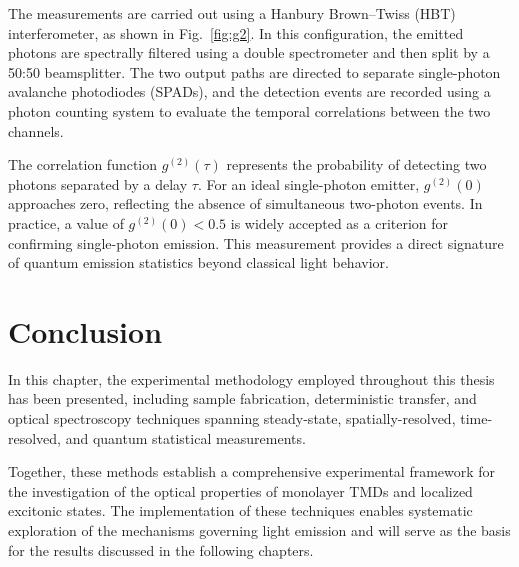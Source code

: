 The measurements are carried out using a Hanbury Brown--Twiss (HBT) interferometer, as shown in Fig.~\ref{fig:g2}. In this configuration, the emitted photons are spectrally filtered using a double spectrometer and then split by a 50:50 beamsplitter. The two output paths are directed to separate single-photon avalanche photodiodes (SPADs), and the detection events are recorded using a photon counting system to evaluate the temporal correlations between the two channels.

The correlation function $g^{(2)}(\tau)$ represents the probability of detecting two photons separated by a delay $\tau$. For an ideal single-photon emitter, $g^{(2)}(0)$ approaches zero, reflecting the absence of simultaneous two-photon events. In practice, a value of $g^{(2)}(0) < 0.5$ is widely accepted as a criterion for confirming single-photon emission. This measurement provides a direct signature of quantum emission statistics beyond classical light behavior.


\section{Conclusion}

In this chapter, the experimental methodology employed throughout this thesis has been presented, including sample fabrication, deterministic transfer, and optical spectroscopy techniques spanning steady-state, spatially-resolved, time-resolved, and quantum statistical measurements. 

Together, these methods establish a comprehensive experimental framework for the investigation of the optical properties of monolayer TMDs and localized excitonic states. The implementation of these techniques enables systematic exploration of the mechanisms governing light emission and will serve as the basis for the results discussed in the following chapters.




\printbibliography[heading=subbibintoc]


